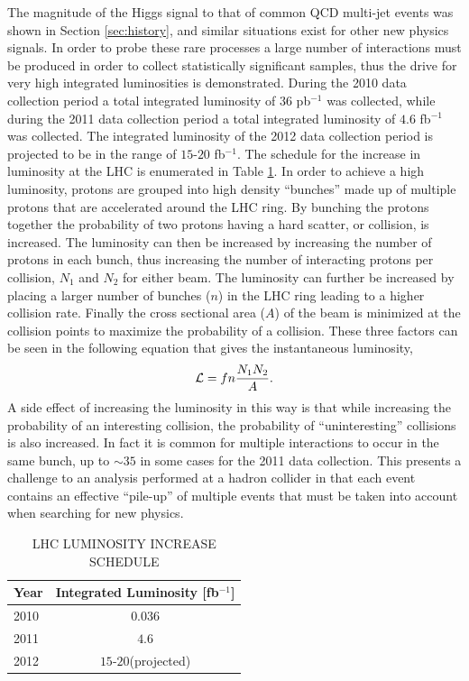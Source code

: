 The magnitude of the Higgs signal to that of common QCD multi-jet events was shown in Section \ref{sec:history}, and similar situations exist for other new physics signals.
In order to probe these rare processes a large number of interactions must be produced in order to collect statistically significant samples, thus the drive for very high integrated luminosities is demonstrated.
During the 2010 data collection period a total integrated luminosity of $36$ pb$^{-1}$ was collected, while during the 2011 data collection period a total integrated luminosity of $4.6$ fb$^{-1}$ was collected.
The integrated luminosity of the 2012 data collection period is projected to be in the range of $15$-$20$ fb$^{-1}$.
The schedule for the increase in luminosity at the LHC is enumerated in Table \ref{tab:lhcluminosity}.
In order to achieve a high luminosity, protons are grouped into high density ``bunches'' made up of multiple protons that are accelerated around the LHC ring. 
By bunching the protons together the probability of two protons having a hard scatter, or collision, is increased.
The luminosity can then be increased by increasing the number of protons in each bunch, thus increasing the number of interacting protons per collision, $N_{1}$ and $N_{2}$ for either beam.
The luminosity can further be increased by placing a larger number of bunches ($n$) in the LHC ring leading to a higher collision rate.
Finally the cross sectional area ($A$) of the beam is minimized at the collision points to maximize the probability of a collision. 
These three factors can be seen in the following equation that gives the instantaneous luminosity,
\begin{equation}
\mathcal{L} = fn\frac{N_{1}N_{2}}{A}.
\end{equation}
A side effect of increasing the luminosity in this way is that while increasing the probability of an interesting collision, the probability of ``uninteresting'' collisions is also increased.
In fact it is common for multiple interactions to occur in the same bunch, up to $\sim 35$ in some cases for the 2011 data collection.
This presents a challenge to an analysis performed at a hadron collider in that each event contains an effective ``pile-up'' of multiple events that must be taken into account when searching for new physics.

\begin{table}[htpb]
\begin{center}
\caption{LHC LUMINOSITY INCREASE SCHEDULE}
\begin{tabular}{lc}
\toprule
Year & Integrated Luminosity [fb$^{-1}$] \\
\midrule
2010 & $0.036$ \\
2011 & $4.6$ \\
2012 & $15$-$20$(projected) \\
\bottomrule
\end{tabular}
\label{tab:lhcluminosity}
\end{center}
\end{table}


